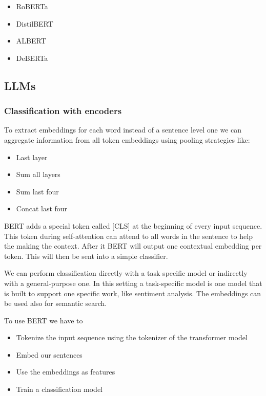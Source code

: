 \begin{itemize}
    \item RoBERTa
    \item DistilBERT
    \item ALBERT
    \item DeBERTa
\end{itemize}

\subsection{LLMs}


\subsubsection{Classification with encoders}

To extract embeddings for each word instead of a sentence level one we can aggregate information from all token embeddings using pooling strategies like:

\begin{itemize}
    \item Last layer
    \item Sum all layers
    \item Sum last four
    \item Concat last four
\end{itemize}


BERT adds a special token called [CLS] at the beginning of every input sequence. This token during self-attention can attend to all words in the sentence to help the making the context. After it BERT will output one contextual embedding per token. This will then be sent into a simple classifier.

\vspace{10pt}

We can perform classification directly with a task specific model or indirectly with a general-purpose one. In this setting a task-specific model is one model that is built to support one specific work, like sentiment analysis. The embeddings can be used also for semantic search. 

\vspace{10pt}

To use BERT we have to

\begin{itemize}
    \item Tokenize the input sequence using the tokenizer of the transformer model
    \item Embed our sentences
    \item Use the embeddings as features
    \item Train a classification model
\end{itemize}

